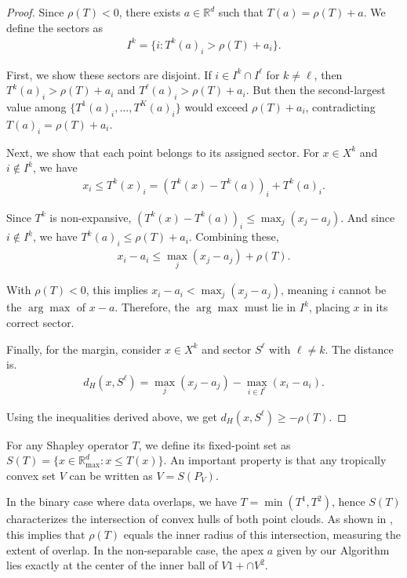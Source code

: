 \documentclass{article}
\newcommand{\R}{\mathbb{R}}
\newcommand{\Rmax}{\mathbb{R}_{\max}}
\begin{document}
\begin{proof}
Since $\rho(T) < 0$, there exists $a \in \R^d$ such that $T(a) = \rho(T) + a$. We define the sectors as
\begin{align}
I^k = \{i : T^k(a)_i > \rho(T) + a_i\}.
\end{align}

First, we show these sectors are disjoint. If $i \in I^k \cap I^{\ell}$ for $k \neq \ell$, then $T^k(a)_i > \rho(T) + a_i$ and $T^{\ell}(a)_i > \rho(T) + a_i$. But then the second-largest value among $\{T^1(a)_i,\ldots,T^K(a)_i\}$ would exceed $\rho(T) + a_i$, contradicting $T(a)_i = \rho(T) + a_i$.

Next, we show that each point belongs to its assigned sector. For $x \in X^k$ and $i \not\in I^k$, we have
\begin{align}
x_i \leq T^k(x)_i = (T^k(x) - T^k(a))_i + T^k(a)_i.
\end{align}

Since $T^k$ is non-expansive, $(T^k(x) - T^k(a))_i \leq \max_j(x_j - a_j)$. And since $i \not\in I^k$, we have $T^k(a)_i \leq \rho(T) + a_i$. Combining these,
\begin{align}
x_i - a_i \leq \max_j(x_j - a_j) + \rho(T).
\end{align}

With $\rho(T) < 0$, this implies $x_i - a_i < \max_j(x_j - a_j)$, meaning $i$ cannot be the $\arg\max$ of $x - a$. Therefore, the $\arg\max$ must lie in $I^k$, placing $x$ in its correct sector.

Finally, for the margin, consider $x \in X^k$ and sector $S^{\ell}$ with $\ell \neq k$. The distance is.
\begin{align}
d_H(x, S^{\ell}) = \max_j(x_j - a_j) - \max_{i \in I^{\ell}}(x_i - a_i).
\end{align}

Using the inequalities derived above, we get $d_H(x, S^{\ell}) \geq -\rho(T)$.
\end{proof}

For any Shapley operator $T$, we define its fixed-point set as $S(T) = \{x \in \Rmax^d : x \leq T(x)\}$. An important property is that any tropically convex set $V$ can be written as $V = S(P_V)$. 

In the binary case where data overlaps, we have $T = \min(T^1, T^2)$, hence $S(T)$ characterizes the intersection of convex hulls of both point clouds. As shown in \cite{akian2020}, this implies that $\rho(T)$ equals the inner radius of this intersection, measuring the extent of overlap. In the non-separable case, the apex $a$ given by our Algorithm lies exactly at the center of the inner ball of $V1+ \cap V^2$.
\end{document}
